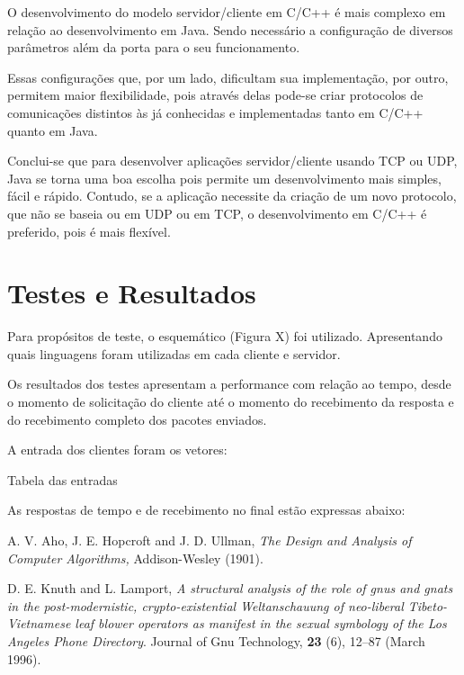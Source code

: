 \documentclass[12pt,a4paper]{article}
\begin{document}
O desenvolvimento do modelo servidor/cliente em C/C++ é mais complexo em relação ao desenvolvimento em Java. Sendo necessário a configuração de diversos parâmetros além da porta para o seu funcionamento.

Essas configurações que, por um lado, dificultam sua implementação, por outro, permitem maior flexibilidade, pois através delas pode-se criar protocolos de comunicações distintos às já conhecidas e implementadas tanto em C/C++ quanto em Java.

Conclui-se que para desenvolver aplicações servidor/cliente usando TCP ou UDP, Java se torna uma boa escolha pois permite um desenvolvimento mais simples, fácil e rápido. Contudo, se a aplicação necessite da criação de um novo protocolo, que não se baseia ou em UDP ou em TCP, o desenvolvimento em C/C++ é preferido, pois é mais flexível.
\newpage
\section{Testes e Resultados}
Para propósitos de teste, o esquemático (Figura X) foi utilizado. Apresentando quais linguagens foram utilizadas em cada cliente e servidor.

Os resultados dos testes apresentam a performance com relação ao tempo, desde o momento de solicitação do cliente até o momento do recebimento da resposta e do recebimento completo dos pacotes enviados.

A entrada dos clientes foram os vetores:

Tabela das entradas

As respostas de tempo e de recebimento no final estão expressas abaixo:

\newpage
\begin{thebibliography}{99}

 A. V. Aho, J. E. Hopcroft and J.  D.  Ullman, {\it The
Design and Analysis of Computer Algorithms,} Addison-Wesley (1901).

 D. E. Knuth and L. Lamport, {\it A structural analysis
of the role of gnus and gnats in the post-modernistic, crypto-existential 
Weltanschauung of neo-liberal Tibeto-Vietnamese leaf blower operators 
as manifest in the sexual symbology of the Los Angeles Phone Directory}.
Journal of Gnu Technology, {\bf 23} (6), 12--87
(March 1996).

\end{thebibliography}
\end{document}
